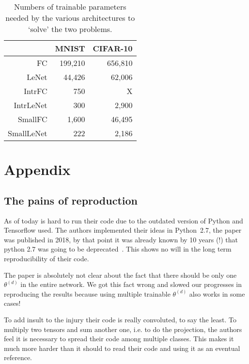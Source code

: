 \documentclass[twocolumn]{article}
\begin{document}
\begin{table}
	\centering
	\begin{tabular}{r|r|r|}
	\cline{2-3}
	                                 & MNIST   & CIFAR-10 \\
	\hline
	\multicolumn{1}{|r|}{FC}         & 199,210 & 656,810 \\
	\multicolumn{1}{|r|}{LeNet}      & 44,426  & 62,006  \\
	\multicolumn{1}{|r|}{IntrFC}     & 750     & X       \\
	\multicolumn{1}{|r|}{IntrLeNet}  & 300     & 2,900   \\
	\multicolumn{1}{|r|}{SmallFC}    & 1,600   & 46,495  \\
	\multicolumn{1}{|r|}{SmallLeNet} & 222     & 2,186   \\
	\hline
	\end{tabular}
	\caption{Numbers of trainable parameters needed by the various architectures
	to `solve' the two problems.}
	\label{tab:params}
\end{table}

\clearpage

\appendix

\section{Appendix}

\subsection{The pains of reproduction}\label{app:troubles}
As of today is hard to run their code due to the outdated version of Python and
Tensorflow used.  The authors implemented their ideas in Python~2.7, the paper
was published in 2018, by that point it was already known by 10 years (!) that
python 2.7 was going to be deprecated~\cite{python}. This shows no will in the
long term reproducibility of their code.

The paper is absolutely not clear about the fact that there should be only one
$\theta^{(d)}$ in the entire network. We got this fact wrong and slowed our
progresses in reproducing the results because using multiple trainable
$\theta^{(d)}$ also works in some cases!

To add insult to the injury their code is really convoluted, to say the least.
To multiply two tensors and sum another one, i.e. to do the projection, the
authors feel it is necessary to spread their code among multiple classes. This
makes it much more harder than it should to read their code and using it as an
eventual reference.



\end{document}
